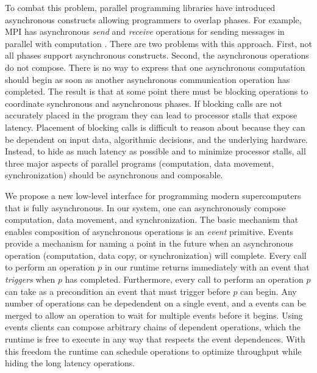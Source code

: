 To combat this problem, parallel programming libraries have introduced
asynchronous constructs allowing programmers to overlap phases.  For
example, MPI has asynchronous {\em send} and {\em receive} operations
for sending messages in parallel with computation \cite{MPI}.  There
are two problems with this approach.  First, not all phases support
asynchronous constructs.  Second, the asynchronous operations do not
compose.  There is no way to express that one asynchronous computation
should begin as soon as another asynchronous communication operation
has completed.  The result is that at some point there must be
blocking operations to coordinate synchronous and asynchronous phases.
If blocking calls are not accurately placed in the program they can
lead to processor stalls that expose latency.  Placement of blocking
calls is difficult to reason about because 
they can be dependent on input data, algorithmic decisions, 
and the underlying hardware.  Instead, to hide as much
latency as possible and to minimize processor stalls, 
all three major aspects of parallel programs (computation, data movement,
synchronization) should be asynchronous and composable.

We propose a new low-level interface for programming modern
supercomputers that is fully asynchronous. In our system, one can
asynchronously compose computation, data movement, and
synchronization.  The basic mechanism that enables composition of 
asynchronous operations
is an {\em event} primitive.  Events provide a mechanism
for naming a point in the future when an asynchronous operation
(computation, data copy, or synchronization) will complete.  Every
call to perform an operation $p$ in our runtime returns immediately
with an event that {\em triggers} when $p$ has completed.
Furthermore, every call to perform an operation $p$ can take as a
precondition an event that must trigger before $p$ can begin.
Any number of operations can be depedendent on a single event, and
a events can be merged to allow an operation to wait for multiple
events before it begins.
  Using
events clients can compose arbitrary chains of dependent
operations, which the runtime is free to execute in any way that
respects the event dependences.  With this freedom the runtime can
schedule operations to optimize throughput while hiding the long
latency operations.

